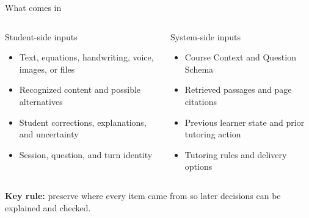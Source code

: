 \documentclass[aspectratio=169,10pt]{beamer}
\begin{document}
\begin{frame}{What comes in}
\begin{columns}[T,onlytextwidth]
\begin{block}{Student-side inputs}
\begin{itemize}
\item Text, equations, handwriting, voice, images, or files
\item Recognized content and possible alternatives
\item Student corrections, explanations, and uncertainty
\item Session, question, and turn identity
\end{itemize}
\end{block}
\begin{block}{System-side inputs}
\begin{itemize}
\item Course Context and Question Schema
\item Retrieved passages and page citations
\item Previous learner state and prior tutoring action
\item Tutoring rules and delivery options
\end{itemize}
\end{block}
\end{columns}
\vspace{.45em}
\centering
\textbf{Key rule:} preserve where every item came from so later decisions can be explained and checked.
\end{frame}
\end{document}
